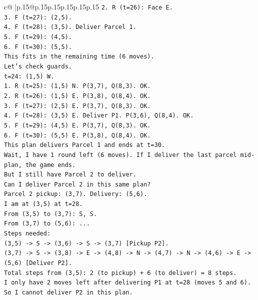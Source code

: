 \documentclass{article}
\begin{document}
{\begin{supertabular}{c@{$\;$}|p{.15\linewidth}@{}p{.15\linewidth}p{.15\linewidth}p{.15\linewidth}p{.15\linewidth}p{.15\linewidth}}
{{{\texttt{2. R (t=26): Face E.} \\
\texttt{3. F (t=27): (2,5).} \\
\texttt{4. F (t=28): (3,5). Deliver Parcel 1.} \\
\texttt{5. F (t=29): (4,5).} \\
\texttt{6. F (t=30): (5,5).} \\
\texttt{This fits in the remaining time (6 moves).} \\
\texttt{Let's check guards.} \\
\texttt{t=24: (1,5) W.} \\
\texttt{1. R (t=25): (1,5) N. P(3,7), Q(8,3). OK.} \\
\texttt{2. R (t=26): (1,5) E. P(3,8), Q(8,4). OK.} \\
\texttt{3. F (t=27): (2,5) E. P(3,7), Q(8,3). OK.} \\
\texttt{4. F (t=28): (3,5) E. Deliver P1. P(3,6), Q(8,4). OK.} \\
\texttt{5. F (t=29): (4,5) E. P(3,7), Q(8,3). OK.} \\
\texttt{6. F (t=30): (5,5) E. P(3,8), Q(8,4). OK.} \\
\texttt{This plan delivers Parcel 1 and ends at t=30.} \\
\texttt{Wait, I have 1 round left (6 moves). If I deliver the last parcel mid{-}plan, the game ends.} \\
\texttt{But I still have Parcel 2 to deliver.} \\
\texttt{Can I deliver Parcel 2 in this same plan?} \\
\texttt{Parcel 2 pickup: (3,7). Delivery: (5,6).} \\
\texttt{I am at (3,5) at t=28.} \\
\texttt{From (3,5) to (3,7): S, S.} \\
\texttt{From (3,7) to (5,6): ...} \\
\texttt{Steps needed:} \\
\texttt{(3,5) {-}> S {-}> (3,6) {-}> S {-}> (3,7) {[}Pickup P2{]}.} \\
\texttt{(3,7) {-}> S {-}> (3,8) {-}> E {-}> (4,8) {-}> N {-}> (4,7) {-}> N {-}> (4,6) {-}> E {-}> (5,6) {[}Deliver P2{]}.} \\
\texttt{Total steps from (3,5): 2 (to pickup) + 6 (to deliver) = 8 steps.} \\
\texttt{I only have 2 moves left after delivering P1 at t=28 (moves 5 and 6).} \\
\texttt{So I cannot deliver P2 in this plan.} \\
}}}
\end{supertabular}}
\end{document}
